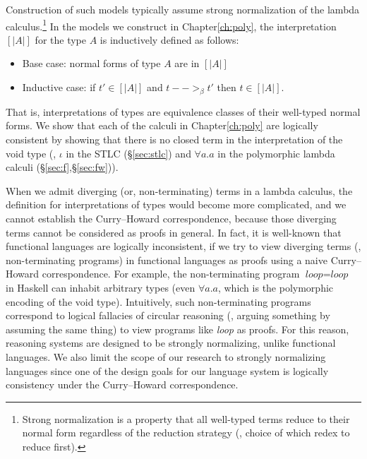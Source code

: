 Construction of such models typically assume strong normalization of
the lambda calculus.\footnote{Strong normalization is a property that
all well-typed terms reduce to their normal form regardless of
the reduction strategy (\ie, choice of which redex to reduce first).}
In the models we construct in Chapter\;\ref{ch:poly},
the interpretation $[| A |]$ for the type $A$ is inductively defined as follows:
\begin{itemize}
        \item Base case: normal forms of type $A$ are in $[| A |]$
        \item Inductive case: if $t' \in [| A |]$ and $t -->_\beta t'$
                then $t \in [| A |]$.
\end{itemize}
That is, interpretations of types are equivalence classes of their
well-typed normal forms.
We show that each of the calculi in Chapter\;\ref{ch:poly} are
logically consistent by showing that there is no closed term
in the interpretation of the void type
(\ie, $\iota$ in the STLC (\S\ref{sec:stlc}) and $\forall a.a$ in
the polymorphic lambda calculi (\S\ref{sec:f},\S\ref{sec:fw})).

When we admit diverging (or, non-terminating) terms in a lambda calculus,
the definition for interpretations of types would become more complicated,
and we cannot establish the Curry--Howard correspondence, because those
diverging terms cannot be considered as proofs in general. In fact,
it is well-known that functional languages are logically inconsistent,
if we try to view diverging terms (\ie, non-terminating programs)
in functional languages as proofs using a naive Curry--Howard correspondence.
For example, the non-terminating program $\textit{loop} = \textit{loop}$
in Haskell can inhabit arbitrary types (even $\forall a.a$,
which is the polymorphic encoding of the void type). Intuitively, such
non-terminating programs correspond to logical fallacies of
circular reasoning (\ie, arguing something by assuming the same thing)
to view programs like \textit{loop} as proofs. For this reason,
reasoning systems are designed to be strongly normalizing, unlike
functional languages. We also limit the scope of our research to
strongly normalizing languages since one of the design goals for our language
system is logically consistency under the Curry--Howard correspondence.



